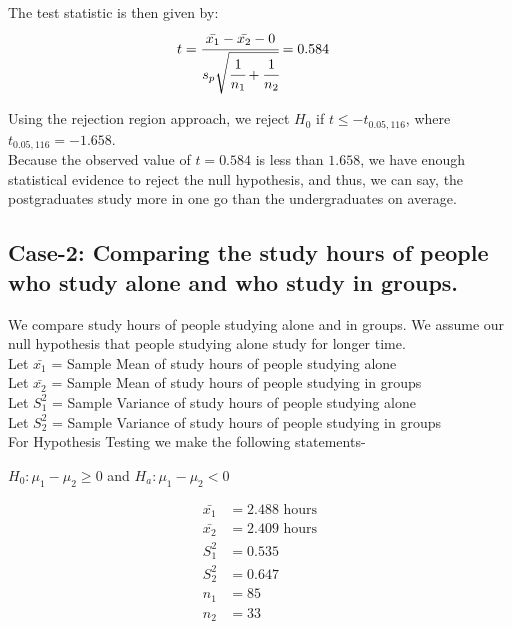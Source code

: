 \documentclass[12pt,onecolumn,letterpaper]{article}
\begin{document}
     

The test statistic is then given by:
 \begin{align}
      t &= \cfrac{\bar{x_1} - \bar{x_2} - 0}{s_p\sqrt{\cfrac{1}{n_1} + \cfrac{1}{n_2}}} = 0.584
 \end{align}
    
 \par
 Using the rejection region approach, we reject $H_0$ if $t \leq -t_{0.05, 116}$, where $t_{0.05,116} = -1.658$.\\ 
 Because the observed value of $t=0.584$ is less than $1.658$, we have enough statistical evidence to reject the null hypothesis, and thus, we can say, the postgraduates study more in one go than the undergraduates on average.

\subsection{Case-2: Comparing the study hours of people who study alone and who study in groups.}
We compare study hours of people studying alone and in groups. We assume our null hypothesis that people studying alone study for longer time.\\

Let $\bar{x_1}$ = Sample Mean of study hours of people studying alone \\
Let $\bar{x_2}$ = Sample Mean of study hours of people studying in groups \\
Let $S_1^2$ = Sample Variance of study hours of people studying alone \\
Let $S_2^2$ = Sample Variance of study hours of people studying in groups \\ 

For Hypothesis Testing we make the following statements-
\begin{center}
    $ H_0 : \mu_1 - \mu_2 \geq 0$ and $H_a : \mu_1 - \mu_2 < 0$  \\
\end{center}

\begin{align}
    \bar{x_1} &= 2.488 \text{ hours}\\ 
    \bar{x_2} &= 2.409 \text{ hours} \\ 
    S^2_1 &= 0.535\\
    S^2_2 &= 0.647\\
    n_1 &= 85\\
    n_2 &= 33
\end{align}
    
\end{document}
